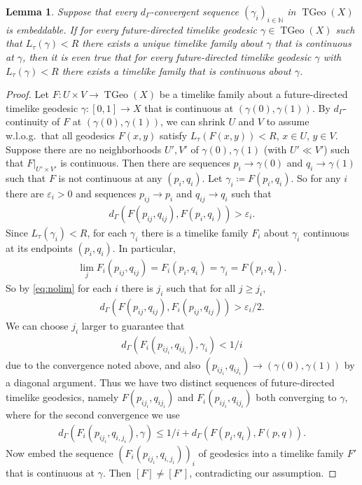 \documentclass[a4paper,11pt]{article}
\numberwithin{equation}{section}
\theoremstyle{plain}
\newtheorem{Lemma}[Definition]{Lemma}
\theoremstyle{definition}
\newcommand{\N}{\mathbb N}
\DeclareMathOperator{\TGeo}{TGeo}
\begin{document}
\begin{Lemma} Suppose that every $d_\Gamma$-convergent sequence $(\gamma_i)_{i\in \N}$ in $\TGeo(X)$ is embeddable.
If for every future-directed timelike geodesic $\gamma \in \TGeo(X)$ such that $L_{\tau}(\gamma) < R$ there exists a unique timelike family about $\gamma$ that is continuous at $\gamma$, then it is even true that for every future-directed timelike geodesic $\gamma$ with $L_{\tau}(\gamma) < R$ there exists a timelike family that is continuous about $\gamma$.
\end{Lemma}
\begin{proof}
Let $F \colon U \times V \to\TGeo(X)$ be a timelike family about a future-directed timelike geodesic $\gamma \colon [0,1] \to X$ that is continuous at $(\gamma(0),\gamma(1))$. By $d_{\Gamma}$-continuity of $F$ at $(\gamma(0),\gamma(1))$, we can shrink $U$ and $V$ to assume w.l.o.g.\ that all geodesics $F(x,y)$ satisfy $L_{\tau}(F(x,y)) < R$, $x \in U$, $y \in V$.\\
Suppose there are no neighborhoods $U',V'$ of $\gamma(0),\gamma(1)$ (with $U'\ll V'$) such that $F|_{U' \times V'}$ is continuous. Then there are sequences $p_i \to \gamma(0)$ and $q_i \to \gamma(1)$ such that $F$ is not continuous at any $(p_i,q_i)$. Let $\gamma_i \coloneqq F(p_i,q_i)$. So for any $i$ there are $\varepsilon_i>0$ and sequences $p_{ij} \to p_i$ and $q_{ij} \to q_i$ such that
\begin{align}\label{eq:nolim}
    d_\Gamma(F(p_{ij}, q_{ij}),F(p_i,q_i))>\varepsilon_i.
\end{align}
Since $L_{\tau}(\gamma_i) < R$, for each $\gamma_i$ there is a timelike family $F_i$ about $\gamma_i$ continuous at its endpoints $(p_i,q_i)$. In particular,
\begin{align}
    \lim_j F_i(p_{ij},q_{ij}) = F_i(p_i,q_i)=\gamma_i = F(p_i,q_i).
\end{align}
So by \eqref{eq:nolim} for each $i$ there is $j_i$ such that for all $j \geq j_i$,
\begin{align}
    d_\Gamma(F(p_{ij},q_{ij}), F_i(p_{ij},q_{ij})) > \varepsilon_i/2.
\end{align}
We can choose $j_i$ larger to guarantee that 
\begin{align}
    d_{\Gamma}(F_i(p_{ij_i},q_{ij_i}),\gamma_i) < 1/i
\end{align}
due to the convergence noted above, and also $(p_{ij_i},q_{ij_i}) \to (\gamma(0),\gamma(1))$ by a diagonal argument. Thus we have two distinct sequences of future-directed timelike geodesics, namely $F(p_{ij_i},q_{ij_i})$ and $F_i(p_{ij_i},q_{ij_i})$ both converging to $\gamma$, where for the second convergence we use
\begin{align}
 d_\Gamma(F_i(p_{ij_i}, q_{i,j_i}),\gamma)\leq 1/i+d_\Gamma(F(p_i,q_i),F(p,q)).
\end{align}
Now embed the sequence $(F_i(p_{ij_i}, q_{i,j_i}))_i$ of geodesics into a timelike family $F'$ that is continuous at $\gamma$. Then $[F]\ne [F']$, contradicting our assumption. 
\end{proof}
\end{document}
